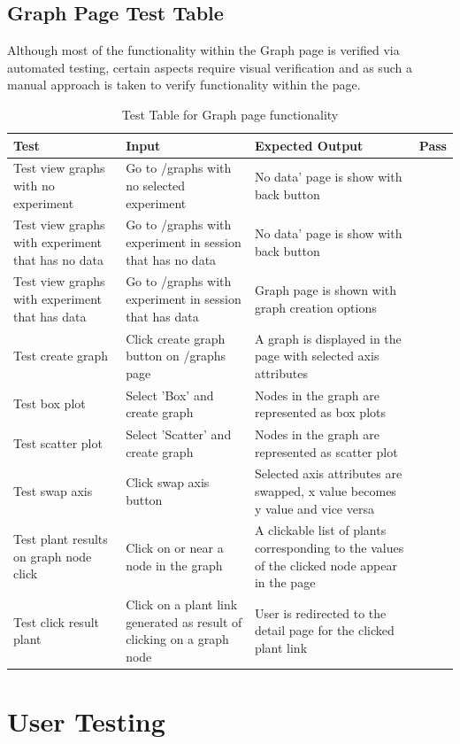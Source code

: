 \subsection{Graph Page Test Table}
Although most of the functionality within the Graph page is verified via automated testing, certain aspects require visual verification and as such a manual approach is taken to verify functionality within the page.
\begin{table}[H]
\centering
\begin{tabular}{ | p{4cm} | p{4cm} |p{4cm} | p{1cm} | }
\hline
	Test & Input & Expected Output & Pass \\ \hline
	Test view graphs with no experiment & Go to /graphs with no selected experiment & No data' page is show with back button & \checkmark \\ \hline
	Test view graphs with experiment that has no  data & Go to /graphs with experiment in session that has no data & No data' page is show with back button & \checkmark \\ \hline
	Test view graphs with experiment that has data & Go to /graphs with experiment in session that has data & Graph page is shown with graph creation options & \checkmark \\ \hline
	Test create graph & Click create graph button on /graphs page & A graph is displayed in the page with selected axis attributes & \checkmark \\ \hline
	Test box plot & Select 'Box' and create graph & Nodes in the graph are represented as box plots & \checkmark \\ \hline
	Test scatter plot & Select 'Scatter' and create graph & Nodes in the graph are represented as scatter plot & \checkmark \\ \hline
	Test swap axis & Click swap axis button & Selected axis attributes are swapped, x value becomes y value and vice versa & \checkmark \\ \hline
	Test plant results on graph node click & Click on or near a node in the graph & A  clickable list of plants corresponding to the values of the clicked node appear in the page & \checkmark \\ \hline
	Test click result plant & Click on a plant link generated as result of clicking on a graph node & User is redirected to the detail page for the clicked plant link & \checkmark \\ \hline
\end{tabular}
\caption{Test Table for Graph page functionality}
\label{test_table_graph}
\end{table}


\section{User Testing}